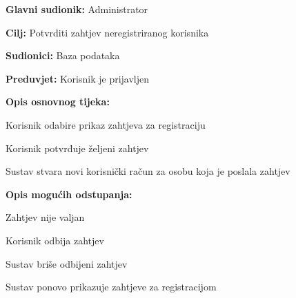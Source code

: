					\noindent {}
					\begin{packed_item}
						
						\item \textbf{Glavni sudionik:} Administrator
						\item  \textbf{Cilj:}  Potvrditi zahtjev neregistriranog korisnika
						\item  \textbf{Sudionici:} Baza podataka
						\item  \textbf{Preduvjet:} Korisnik je prijavljen
						\item  \textbf{Opis osnovnog tijeka:}
						
						\item[] \begin{packed_enum}
							
							\item Korisnik odabire prikaz zahtjeva za registraciju
							\item Korisnik potvrđuje željeni zahtjev
							\item Sustav stvara novi korisnički račun za osobu koja je poslala zahtjev
							
						\end{packed_enum}
						
						\item  \textbf{Opis mogućih odstupanja:}
						
						\item[] \begin{packed_item}
							
							\item[2.a] Zahtjev nije valjan
							\item[] \begin{packed_enum}
								
								\item Korisnik odbija zahtjev
								\item Sustav briše odbijeni zahtjev
								\item Sustav ponovo prikazuje zahtjeve za registracijom
								
							\end{packed_enum}
							
						\end{packed_item}
						
					\end{packed_item}
				
